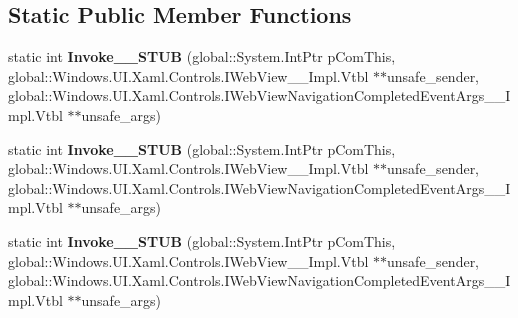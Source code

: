 \subsection*{Static Public Member Functions}
\begin{DoxyCompactItemize}
\item 
\mbox{\label{struct_windows_1_1_foundation_1_1_typed_event_handler___a___windows___u_i___xaml___controls___we5456bcb78d92d2dc8a40fc7f9961d992_a37282d91d6909a406e43c36dbe1e2da0}} 
static int {\bfseries Invoke\+\_\+\+\_\+\+S\+T\+UB} (global\+::\+System.\+Int\+Ptr p\+Com\+This, global\+::\+Windows.\+U\+I.\+Xaml.\+Controls.\+I\+Web\+View\+\_\+\+\_\+\+Impl.\+Vtbl $\ast$$\ast$unsafe\+\_\+sender, global\+::\+Windows.\+U\+I.\+Xaml.\+Controls.\+I\+Web\+View\+Navigation\+Completed\+Event\+Args\+\_\+\+\_\+\+Impl.\+Vtbl $\ast$$\ast$unsafe\+\_\+args)
\item 
\mbox{\label{struct_windows_1_1_foundation_1_1_typed_event_handler___a___windows___u_i___xaml___controls___we5456bcb78d92d2dc8a40fc7f9961d992_a37282d91d6909a406e43c36dbe1e2da0}} 
static int {\bfseries Invoke\+\_\+\+\_\+\+S\+T\+UB} (global\+::\+System.\+Int\+Ptr p\+Com\+This, global\+::\+Windows.\+U\+I.\+Xaml.\+Controls.\+I\+Web\+View\+\_\+\+\_\+\+Impl.\+Vtbl $\ast$$\ast$unsafe\+\_\+sender, global\+::\+Windows.\+U\+I.\+Xaml.\+Controls.\+I\+Web\+View\+Navigation\+Completed\+Event\+Args\+\_\+\+\_\+\+Impl.\+Vtbl $\ast$$\ast$unsafe\+\_\+args)
\item 
\mbox{\label{struct_windows_1_1_foundation_1_1_typed_event_handler___a___windows___u_i___xaml___controls___we5456bcb78d92d2dc8a40fc7f9961d992_a37282d91d6909a406e43c36dbe1e2da0}} 
static int {\bfseries Invoke\+\_\+\+\_\+\+S\+T\+UB} (global\+::\+System.\+Int\+Ptr p\+Com\+This, global\+::\+Windows.\+U\+I.\+Xaml.\+Controls.\+I\+Web\+View\+\_\+\+\_\+\+Impl.\+Vtbl $\ast$$\ast$unsafe\+\_\+sender, global\+::\+Windows.\+U\+I.\+Xaml.\+Controls.\+I\+Web\+View\+Navigation\+Completed\+Event\+Args\+\_\+\+\_\+\+Impl.\+Vtbl $\ast$$\ast$unsafe\+\_\+args)
\item 

\end{DoxyCompactItemize}
